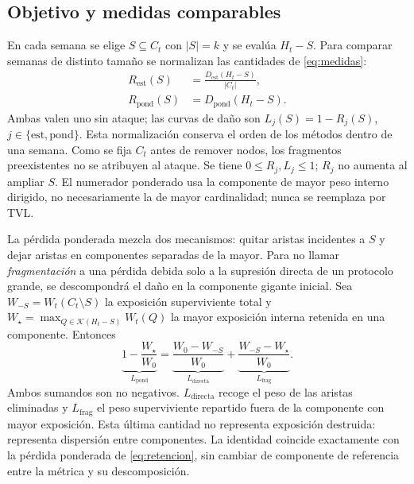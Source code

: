 \documentclass[journal]{IEEEtran}
\begin{document}
\subsection{Objetivo y medidas comparables}

En cada semana se elige $S\subseteq C_t$ con $|S|=k$ y se evalúa $H_t-S$.
Para comparar semanas de distinto tamaño se normalizan las cantidades de
\eqref{eq:medidas}:
\begin{equation}
\begin{aligned}
R_{\mathrm{est}}(S)&=
\frac{D_{\mathrm{est}}(H_t-S)}{|C_t|},\\
R_{\mathrm{pond}}(S)&=D_{\mathrm{pond}}(H_t-S).
\end{aligned}
\label{eq:retencion}
\end{equation}
Ambas valen uno sin ataque; las curvas de daño son
$L_j(S)=1-R_j(S)$, $j\in\{\mathrm{est},\mathrm{pond}\}$. Esta
normalización conserva el orden de los métodos dentro de una semana. Como se
fija $C_t$ antes de remover nodos, los fragmentos preexistentes no se atribuyen
al ataque. Se tiene $0\leq R_j,L_j\leq1$; $R_j$ no aumenta al ampliar $S$.
El numerador ponderado usa la componente de mayor peso interno dirigido,
no necesariamente la de mayor cardinalidad; nunca se reemplaza por TVL.

La pérdida ponderada mezcla dos mecanismos: quitar aristas incidentes a $S$ y
dejar aristas en componentes separadas de la mayor. Para no llamar
\emph{fragmentación} a una pérdida debida solo a la supresión directa de un
protocolo grande, se descompondrá el daño en la componente gigante inicial.
Sea $W_{-S}=W_t(C_t\setminus S)$ la exposición superviviente total y
$W_\star=\max_{Q\in\mathcal K(H_t-S)}W_t(Q)$ la mayor exposición interna
retenida en una componente. Entonces
\begin{equation}
\underbrace{1-\frac{W_\star}{W_0}}_{L_{\mathrm{pond}}}
=\underbrace{\frac{W_0-W_{-S}}{W_0}}_{L_{\mathrm{directa}}}
+\underbrace{\frac{W_{-S}-W_\star}{W_0}}_{L_{\mathrm{frag}}}.
\label{eq:descomposicion}
\end{equation}
Ambos sumandos son no negativos. $L_{\mathrm{directa}}$ recoge el peso de las
aristas eliminadas y $L_{\mathrm{frag}}$ el peso superviviente repartido fuera
de la componente con mayor exposición. Esta última cantidad no representa
exposición destruida: representa dispersión entre componentes. La identidad
coincide exactamente con la pérdida ponderada de \eqref{eq:retencion}, sin
cambiar de componente de referencia entre la métrica y su descomposición.
\end{document}
